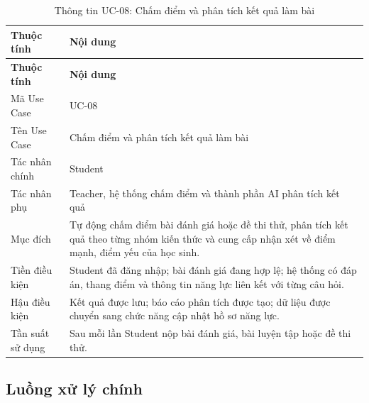 \begin{longtable}{|p{4.2cm}|p{10.2cm}|}
	\caption{Thông tin UC-08: Chấm điểm và phân tích kết quả làm bài}
	\label{tab:uc08-info}\\
	\hline
	\textbf{Thuộc tính} & \textbf{Nội dung} \\
	\hline
	\endfirsthead
	
	\hline
	\textbf{Thuộc tính} & \textbf{Nội dung} \\
	\hline
	\endhead
	
	Mã Use Case &
	UC-08 \\
	\hline
	
	Tên Use Case &
	Chấm điểm và phân tích kết quả làm bài \\
	\hline
	
	Tác nhân chính &
	Student \\
	\hline
	
	Tác nhân phụ &
	Teacher, hệ thống chấm điểm và thành phần AI phân tích kết quả \\
	\hline
	
	Mục đích &
	Tự động chấm điểm bài đánh giá hoặc đề thi thử, phân tích kết quả theo
	từng nhóm kiến thức và cung cấp nhận xét về điểm mạnh, điểm yếu của học
	sinh. \\
	\hline
	
	Tiền điều kiện &
	Student đã đăng nhập; bài đánh giá đang hợp lệ; hệ thống có đáp án,
	thang điểm và thông tin năng lực liên kết với từng câu hỏi. \\
	\hline
	
	Hậu điều kiện &
	Kết quả được lưu; báo cáo phân tích được tạo; dữ liệu được chuyển sang
	chức năng cập nhật hồ sơ năng lực. \\
	\hline
	
	Tần suất sử dụng &
	Sau mỗi lần Student nộp bài đánh giá, bài luyện tập hoặc đề thi thử. \\
	\hline
	
\end{longtable}

\subsection{Luồng xử lý chính}

